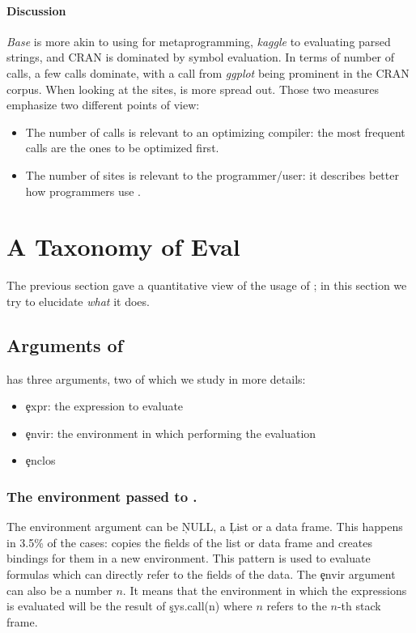 \documentclass[screen,acmsmall]{acmart}
\begin{document}
\paragraph{Discussion} \emph{Base} is more akin to using \eval for metaprogramming, \emph{kaggle} to evaluating parsed strings, and CRAN is dominated by symbol evaluation. In terms of number of calls, a few calls dominate, with a call from \emph{ggplot} being prominent in the CRAN corpus. When looking at the \eval sites, \eval is more spread out. Those two measures emphasize two different points of view:

\begin{itemize}
	\item The number of calls is relevant to an optimizing compiler: the most frequent calls are the ones to be optimized first.
	\item The number of sites is relevant to the programmer/user: it describes better how programmers use \eval.
\end{itemize}



\section{A Taxonomy of Eval}

The previous section gave a quantitative view of the usage of \eval;
in this section we try to elucidate \emph{what} it does.

\subsection{Arguments of \eval}

\eval has three arguments, two of which we study in more details:

\begin{itemize}
	\item \c{expr}: the expression to evaluate
	\item \c{envir}: the environment in which performing the evaluation
	\item \c{enclos}
\end{itemize}

\subsubsection{The environment passed to \eval.}

The environment argument can be \c{NULL}, a \c{List}
or a data frame. This happens in 3.5\% of the cases: \eval copies the
fields of the list or data frame and creates bindings for them in a
new environment. This pattern is used to evaluate formulas which can
directly refer to the fields of the data. The \c{envir} argument can
also be a number $n$. It means that the environment in which the
expressions is evaluated will be the result of \c{sys.call(n)} where
$n$ refers to the $n$-th stack frame.
\end{document}
